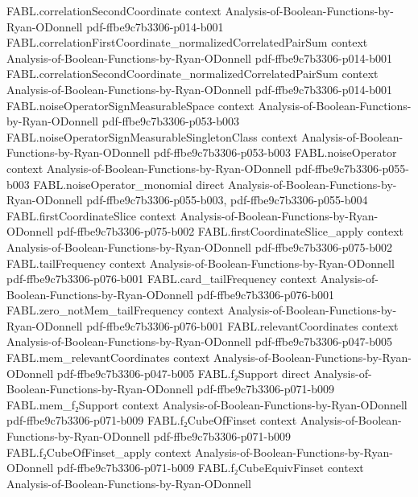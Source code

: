 \begin{theorem}
  {FABL.correlationSecondCoordinate}
  {context}
  {Analysis-of-Boolean-Functions-by-Ryan-ODonnell}
  {pdf-ffbe9c7b3306-p014-b001}
\proofstep
  {FABL.correlationFirstCoordinate_normalizedCorrelatedPairSum}
  {context}
  {Analysis-of-Boolean-Functions-by-Ryan-ODonnell}
  {pdf-ffbe9c7b3306-p014-b001}
\proofstep
  {FABL.correlationSecondCoordinate_normalizedCorrelatedPairSum}
  {context}
  {Analysis-of-Boolean-Functions-by-Ryan-ODonnell}
  {pdf-ffbe9c7b3306-p014-b001}
\proofstep
  {FABL.noiseOperatorSignMeasurableSpace}
  {context}
  {Analysis-of-Boolean-Functions-by-Ryan-ODonnell}
  {pdf-ffbe9c7b3306-p053-b003}
\proofstep
  {FABL.noiseOperatorSignMeasurableSingletonClass}
  {context}
  {Analysis-of-Boolean-Functions-by-Ryan-ODonnell}
  {pdf-ffbe9c7b3306-p053-b003}
\proofstep
  {FABL.noiseOperator}
  {context}
  {Analysis-of-Boolean-Functions-by-Ryan-ODonnell}
  {pdf-ffbe9c7b3306-p055-b003}
\proofstep
  {FABL.noiseOperator_monomial}
  {direct}
  {Analysis-of-Boolean-Functions-by-Ryan-ODonnell}
  {pdf-ffbe9c7b3306-p055-b003,
    pdf-ffbe9c7b3306-p055-b004}
\proofstep
  {FABL.firstCoordinateSlice}
  {context}
  {Analysis-of-Boolean-Functions-by-Ryan-ODonnell}
  {pdf-ffbe9c7b3306-p075-b002}
\proofstep
  {FABL.firstCoordinateSlice_apply}
  {context}
  {Analysis-of-Boolean-Functions-by-Ryan-ODonnell}
  {pdf-ffbe9c7b3306-p075-b002}
\proofstep
  {FABL.tailFrequency}
  {context}
  {Analysis-of-Boolean-Functions-by-Ryan-ODonnell}
  {pdf-ffbe9c7b3306-p076-b001}
\proofstep
  {FABL.card_tailFrequency}
  {context}
  {Analysis-of-Boolean-Functions-by-Ryan-ODonnell}
  {pdf-ffbe9c7b3306-p076-b001}
\proofstep
  {FABL.zero_notMem_tailFrequency}
  {context}
  {Analysis-of-Boolean-Functions-by-Ryan-ODonnell}
  {pdf-ffbe9c7b3306-p076-b001}
\proofstep
  {FABL.relevantCoordinates}
  {context}
  {Analysis-of-Boolean-Functions-by-Ryan-ODonnell}
  {pdf-ffbe9c7b3306-p047-b005}
\proofstep
  {FABL.mem_relevantCoordinates}
  {context}
  {Analysis-of-Boolean-Functions-by-Ryan-ODonnell}
  {pdf-ffbe9c7b3306-p047-b005}
\proofstep
  {FABL.f₂Support}
  {direct}
  {Analysis-of-Boolean-Functions-by-Ryan-ODonnell}
  {pdf-ffbe9c7b3306-p071-b009}
\proofstep
  {FABL.mem_f₂Support}
  {context}
  {Analysis-of-Boolean-Functions-by-Ryan-ODonnell}
  {pdf-ffbe9c7b3306-p071-b009}
\proofstep
  {FABL.f₂CubeOfFinset}
  {context}
  {Analysis-of-Boolean-Functions-by-Ryan-ODonnell}
  {pdf-ffbe9c7b3306-p071-b009}
\proofstep
  {FABL.f₂CubeOfFinset_apply}
  {context}
  {Analysis-of-Boolean-Functions-by-Ryan-ODonnell}
  {pdf-ffbe9c7b3306-p071-b009}
\proofstep
  {FABL.f₂CubeEquivFinset}
  {context}
  {Analysis-of-Boolean-Functions-by-Ryan-ODonnell}

\end{theorem}
